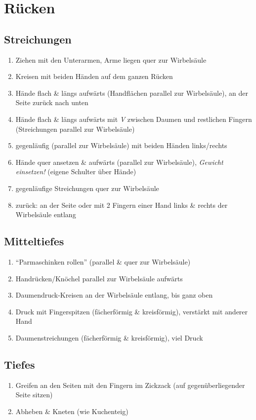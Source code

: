 \section{Rücken}

\subsection{Streichungen}
\begin{enumerate}
\item Ziehen mit den Unterarmen, Arme liegen quer zur Wirbelsäule
\item Kreisen mit beiden Händen auf dem ganzen Rücken
\item Hände flach \& längs aufwärts (Handflächen parallel zur Wirbelsäule), an der Seite zurück nach unten
\item Hände flach \& längs aufwärts mit \emph{V} zwischen Daumen und restlichen Fingern (Streichungen parallel zur Wirbelsäule)
\item gegenläufig (parallel zur Wirbelsäule) mit beiden Händen links/rechts
\item Hände quer ansetzen \& aufwärts (parallel zur Wirbelsäule), \emph{Gewicht einsetzen!} (eigene Schulter über Hände)
\item gegenläufige Streichungen quer zur Wirbelsäule
\item zurück: an der Seite oder mit 2 Fingern einer Hand links \& rechts der Wirbelsäule entlang
\end{enumerate}

\subsection{Mitteltiefes}
\begin{enumerate}
\item "`Parmaschinken rollen"' (parallel \& quer zur Wirbelsäule)
\item Handrücken/Knöchel parallel zur Wirbelsäule aufwärts
\item Daumendruck-Kreisen an der Wirbelsäule entlang, bis ganz oben
\item Druck mit Fingerspitzen (fächerförmig \& kreisförmig), verstärkt mit anderer Hand
\item Daumenstreichungen (fächerförmig \& kreisförmig), viel Druck
\end{enumerate}

\subsection{Tiefes}
\begin{enumerate}
\item Greifen an den Seiten mit den Fingern im Zickzack (auf gegenüberliegender Seite sitzen)
\item Abheben \& Kneten (wie Kuchenteig)
\end{enumerate}

